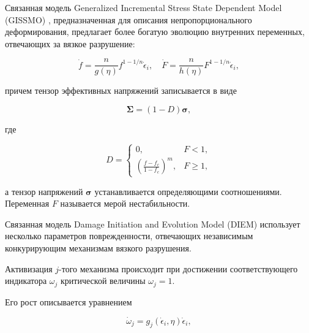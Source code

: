 Связанная модель Generalized Incremental Stress State Dependent Model ({\small \sc GISSMO}) \cite{keller:bib:andr}, предназначенная для описания непропорционального деформирования, предлагает более богатую эволюцию внутренних переменных, отвечающих за вязкое разрушение:

\begin{equation}

	\dot{f}=\frac{n}{g(\eta)}f^{1-1/n}\dot{\epsilon}_i,\quad \dot{F}=\frac{n}{h(\eta)}F^{1-1/n}\dot{\epsilon}_i,

\end{equation}

причем тензор эффективных напряжений записывается в виде

\begin{equation}\label{keller:eq:gurson1111}

	\boldsymbol{\Sigma}=(1-D)\boldsymbol{\sigma},

\end{equation}\label{keller:eq:100} 

где 

\begin{equation}

	D=

\left\{	

	\begin{array}{cc}

	0,& F< 1,\\

	\left(\frac{f-f_c}{1-f_c}\right)^m,& F\geq 1,

	\end{array}

\right.

\end{equation}

а тензор напряжений $\boldsymbol{\sigma}$ устанавливается определяющими соотношениями. Переменная $F$ называется мерой нестабильности.



Связанная модель Damage Initiation and Evolution Model ({\small\sc DIEM}) \cite{keller:bib:andr2} использует несколько параметров поврежденности, отвечающих независимым конкурирующим механизмам вязкого разрушения. 

Активизация $j$-того механизма происходит при достижении соответствующего индикатора  $\omega_j$ критической величины $\omega_j=1.$ 

Его рост описывается уравнением

\begin{equation}

	\dot{\omega}_j=g_j(\dot{\epsilon}_i,\eta)\dot{\epsilon}_i,

\end{equation}

